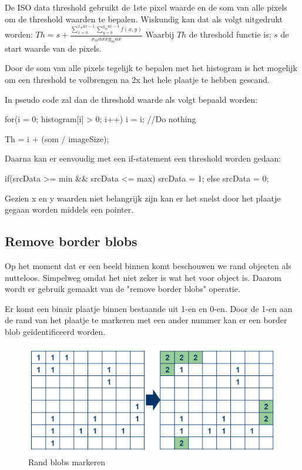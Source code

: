 De ISO data threshold gebruikt de 1ste pixel waarde en de som van alle pixels om
de threshold waarden te bepalen.
Wiskundig kan dat als volgt uitgedrukt worden:
$Th = s + \frac{\sum\limits_{x=0}^{x_max-1} \sum\limits_{y=0}^{y_max-1} f(x, y)}{x_max x y_max}  $
Waarbij $Th$ de threshold functie is;
$s$ de start waarde van de pixels.

Door de som van alle pixels tegelijk te bepalen met het histogram is het mogelijk
om een threshold te volbrengen na 2x het hele plaatje te hebben gescand.

In pseudo code zal dan de threshold waarde als volgt bepaald worden:

\begin{cppcode}
    for(i = 0; histogram[i] > 0; i++){
        i = i; //Do nothing
    }

    Th = i + (som / imageSize);
\end{cppcode}

Daarna  kan er eenvoudig met een if-statement een threshold worden gedaan:

\begin{cppcode}
    if(srcData >= min && srcData <= max){
        srcData = 1;
    } else {
        srcData = 0;
    }
\end{cppcode}

Gezien x en y waarden niet belangrijk zijn kan er het snelst door het plaatje
gegaan worden middels een pointer.

\subsection{Remove border blobs}
\label{sub:rembb}

Op het moment dat er een beeld binnen komt beschouwen we rand objecten als
nutteloos. Simpelweg omdat het niet zeker is wat het voor object is. Daarom
wordt er gebruik gemaakt van de "remove border blobs" operatie.

Er komt een binair plaatje binnen bestaande uit 1-en en 0-en. Door de 1-en
aan de rand van het plaatje te markeren met een ander nummer kan er een
border blob geïdentificeerd worden.

\begin{figure}
    \begin{center}
        \includegraphics[scale=0.5]{figures/border_blob_step1.png}
    \end{center}
    \caption{Rand blobs markeren}
    \label{fig:bbstep1}
\end{figure}

